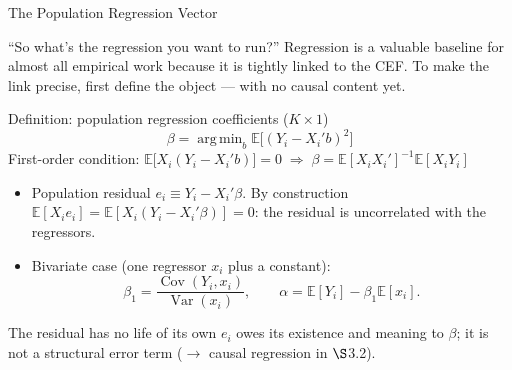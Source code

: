 \documentclass[aspectratio=169,11pt]{beamer}
\newcommand{\E}{\mathbb{E}}
\newcommand{\Var}{\operatorname{Var}}
\newcommand{\Cov}{\operatorname{Cov}}
\DeclareMathOperator*{\argmin}{arg\,min}
\newcommand{\Sec}{\ensuremath{\S}}
\begin{document}
\begin{frame}{The Population Regression Vector}
\small

``So what's the regression you want to run?'' Regression is a valuable
baseline for almost all empirical work because it is tightly linked to the
CEF. To make the link precise, first define the object --- with
\alert{no causal content yet}.

\begin{block}{Definition: population regression coefficients ($K\times1$)}
\[
\beta = \argmin_b \E\big[(Y_i-X_i'b)^2\big]
\tag{3.1.2}
\]
First-order condition:
$\E\big[X_i(Y_i-X_i'b)\big]=0
\;\Longrightarrow\;
\boxed{\beta = \E[X_iX_i']^{-1}\E[X_iY_i]}$
\end{block}

\begin{itemize}
    \item Population residual $e_i\equiv Y_i-X_i'\beta$. By construction
    $\E[X_ie_i]=\E[X_i(Y_i-X_i'\beta)]=0$: the residual is uncorrelated with
    the regressors.
    \item Bivariate case (one regressor $x_i$ plus a constant):
    \[
    \beta_1 = \frac{\Cov(Y_i,x_i)}{\Var(x_i)},
    \qquad
    \alpha = \E[Y_i]-\beta_1\E[x_i].
    \]
\end{itemize}

\begin{alertblock}{The residual has no life of its own}
$e_i$ owes its existence and meaning to $\beta$; it is not a structural
error term ($\rightarrow$ causal regression in \Sec{}3.2).
\end{alertblock}

\end{frame}
\end{document}
